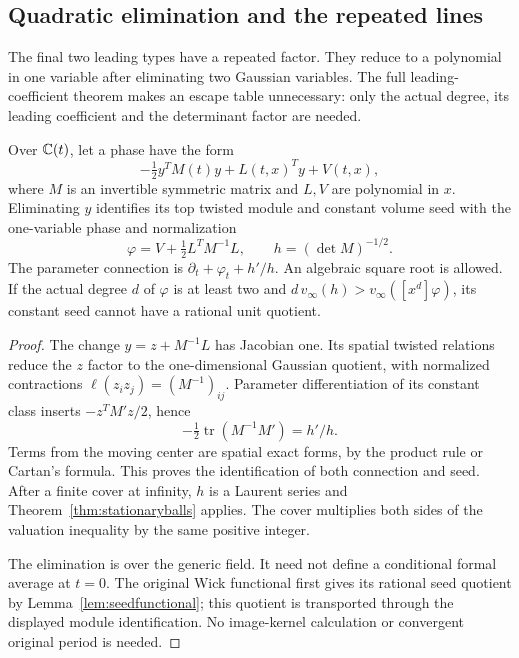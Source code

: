 \subsection{Quadratic elimination and the repeated lines}
\label{sec:repeatedlines}

The final two leading types have a repeated factor. They reduce
to a polynomial in one variable after eliminating two Gaussian
variables. The full leading-coefficient theorem makes an escape
table unnecessary: only the actual degree, its leading
coefficient and the determinant factor are needed.

\begin{lemma}
\label{lem:quadraticelimination}
Over $\mathbb C(t)$, let a phase have the form
\[
 -\tfrac12 y^T M(t)y+L(t,x)^Ty+V(t,x),
\]
where $M$ is an invertible symmetric matrix and $L,V$ are
polynomial in $x$. Eliminating $y$ identifies its top twisted
module and constant volume seed with the one-variable phase
and normalization
\[
 \varphi=V+\tfrac12L^TM^{-1}L,\qquad
 h=(\det M)^{-1/2}.
\]
The parameter connection is
$\partial_t+\varphi_t+h'/h$. An algebraic square root is allowed.
If the actual degree $d$ of $\varphi$ is at least two and
$d\,v_\infty(h)>v_\infty([x^d]\varphi)$, its constant seed
cannot have a rational unit quotient.
\end{lemma}
\begin{proof}
The change $y=z+M^{-1}L$ has Jacobian one. Its spatial twisted
relations reduce the $z$ factor to the one-dimensional Gaussian
quotient, with normalized contractions
$\ell(z_i z_j)=(M^{-1})_{ij}$. Parameter differentiation of its
constant class inserts $-z^TM'z/2$, hence
\[
 -\tfrac12\operatorname{tr}(M^{-1}M')=h'/h.
\]
Terms from the moving center are spatial exact forms, by the
product rule or Cartan's formula. This proves the identification
of both connection and seed. After a finite cover at infinity,
$h$ is a Laurent series and Theorem~\ref{thm:stationaryballs}
applies. The cover multiplies both sides of the valuation
inequality by the same positive integer.

The elimination is over the generic field. It need not define
a conditional formal average at $t=0$. The original Wick
functional first gives its rational seed quotient by
Lemma~\ref{lem:seedfunctional}; this quotient is transported
through the displayed module identification. No image-kernel
calculation or convergent original period is needed.
\end{proof}

